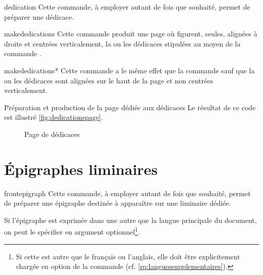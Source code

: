 \begin{docCommand}{dedication}{}
  Cette commande, à employer autant de fois que
  souhaité\hauteurpage{}, permet de préparer une dédicace.
\end{docCommand}

\begin{docCommand}{makededications}{}
  Cette commande produit une page où figurent, seules,
  alignées à droite et centrées verticalement, la ou les dédicaces stipulées au
  moyen de la commande .
\end{docCommand}
%
\begin{docCommand}{makededications*}{}
  Cette commande a le même effet que la commande
   sauf que la ou les dédicaces sont alignées sur le
  haut de la page et non centrées verticalement.
\end{docCommand}

\begin{dbexample}{Préparation et production de la page dédiée aux dédicaces}{}
  \NoAutoSpacing%
%
  Le résultat de ce code est illustré \vref{fig:dedicationspage}.
\end{dbexample}

\begin{figure}[htbp]
  \centering {}%
  \caption{Page de dédicaces}
  \label{fig:dedicationspage}
\end{figure}

\section{Épigraphes liminaires}

\begin{docCommand}{frontepigraph}{}
  Cette commande, à employer autant de fois que
  souhaité\hauteurpage{}, permet de préparer une épigraphe destinée à
  apparaître sur une \gls{liminaire} dédiée.

  Si l'épigraphe est exprimée dans une   autre que la langue principale du document, on peut le
  spécifier en argument optionnel\footnote{Si cette  est autre que
    le français ou l'anglais, elle doit être explicitement chargée en option de
    la commande  (cf.
    \vref{rq:languessupplementaires}).}.
\end{docCommand}

